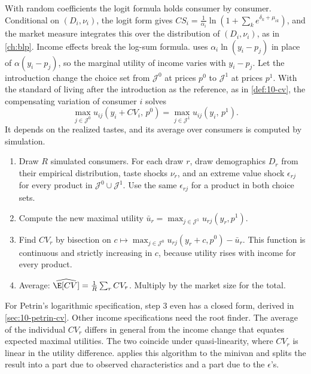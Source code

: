 With random coefficients the logit formula holds consumer by
consumer. Conditional on $(D_i,\nu_i)$, the logit form gives $CS_i = \frac{1}{\alpha_i}\ln(1 + \sum_k
e^{\delta_k + \mu_{ik}})$, and the market measure integrates this over the distribution of $(D_i,\nu_i)$, as in
\cref{ch:blp}. Income effects break the log-sum formula.  uses $\alpha_i\ln(y_i - p_j)$ in place
of $\alpha(y_i - p_j)$, so the marginal utility of income varies with $y_i - p_j$. Let the introduction change the
choice set from $\mathcal{J}^0$ at prices $p^0$ to $\mathcal{J}^1$ at prices $p^1$. With the standard of living
after the introduction as the reference, as in \cref{def:10-cv}, the compensating variation of consumer $i$ solves
\begin{equation}\label{eq:10-cv-income}
\max_{j\in\mathcal{J}^0}u_{ij}\left(y_i + CV_i,\, p^0\right) = \max_{j\in\mathcal{J}^1}u_{ij}\left(y_i,\, p^1\right).
\end{equation}
It depends on the realized tastes, and its average over consumers is computed by simulation.
\begin{enumerate}
\item Draw $R$ simulated consumers. For each draw $r$, draw demographics $D_r$ from their empirical distribution,
taste shocks $\nu_r$, and an extreme value shock $\epsilon_{rj}$ for every product in $\mathcal{J}^0\cup
\mathcal{J}^1$. Use the same $\epsilon_{rj}$ for a product in both choice sets.
\item Compute the new maximal utility $\bar u_r = \max_{j\in\mathcal{J}^1}u_{rj}(y_r, p^1)$.
\item Find $CV_r$ by bisection on $c\mapsto\max_{j\in\mathcal{J}^0}u_{rj}(y_r + c, p^0) - \bar u_r$. This
function is continuous and strictly increasing in $c$, because utility rises with income for every product.
\item Average: $\widehat{\E[CV]} = \frac{1}{R}\sum_r CV_r$. Multiply by the market size for the total.
\end{enumerate}
For Petrin's logarithmic specification, step 3 even has a closed form, derived in \cref{sec:10-petrin-cv}. Other
income specifications need the root finder.
The average of the individual $CV_r$ differs in general from the income change that equates expected maximal
utilities. The two coincide under quasi-linearity, where $CV_r$ is linear in the utility difference.
 applies this algorithm to the minivan and splits the result into a part due to observed
characteristics and a part due to the $\epsilon$'s.

